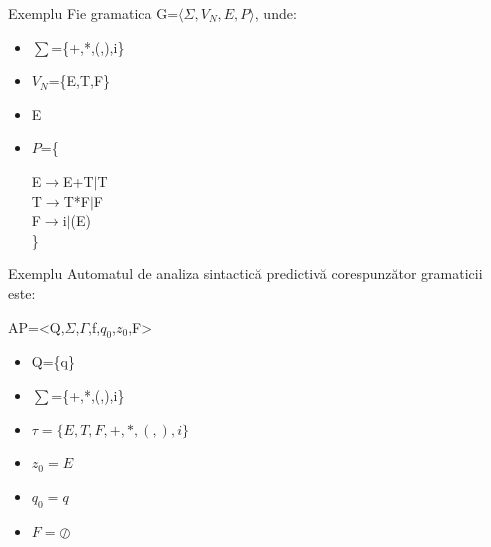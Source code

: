 \documentclass[pdf]{beamer}
\begin{document}
\begin{frame}{Exemplu}
Fie gramatica G=$\langle \Sigma, V_N, E, P \rangle$, unde:

\begin{itemize}
\item
$\sum$=\{+,*,(,),i\}
\item
$V_N$=\{E,T,F\}
\item
E
\item
$P$=\{

\hspace{1cm} E$\to$E+T$\mid$T\\
\hspace{1cm} T$\to$T*F$\mid$F\\
\hspace{1cm} F$\to$i$\mid$(E)\\
\}
\end{itemize}
\end{frame}



\begin{frame}{Exemplu}
Automatul de analiza sintactică predictivă corespunzător gramaticii este:

AP=<Q,$\Sigma$,$\Gamma$,f,$q_{0}$,$z_{0}$,F>

\begin{itemize}
\item
Q=\{q\}

\item
$\sum$=\{+,*,(,),i\}

\item
$\tau = \{E,T,F,+,*,(,),i\}$

\item
$z_0 = E$

\item
$q_0 = q$

\item
$F=\oslash$\\

\end{itemize}
\end{frame}
\end{document}
